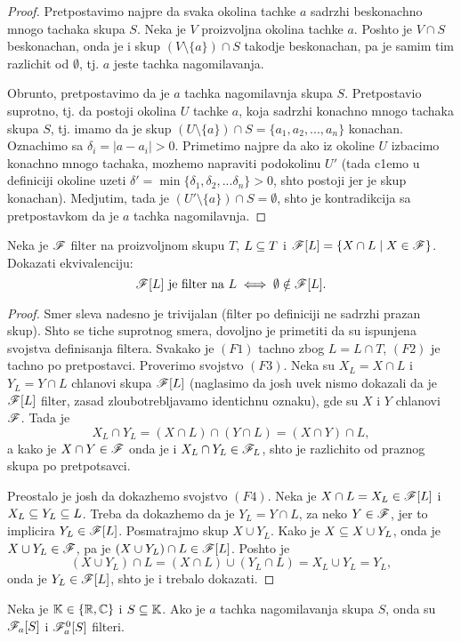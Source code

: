 \documentclass[../main_og.tex]{subfiles}
\begin{document}
    \begin{proof}
        Pretpostavimo najpre da svaka okolina tachke $a$ sadrzhi beskonachno mnogo tachaka skupa $S$. Neka je $V$ proizvoljna okolina tachke $a$. 
	Poshto je $V\cap S$ beskonachan, onda je i skup $(V\setminus\{a\}) \cap S$ takodje beskonachan, pa je samim tim razlichit od $\emptyset$,
	tj. $a$ jeste tachka nagomilavanja. 

	Obrunto, pretpostavimo da je $a$ tachka nagomilavnja skupa $S$. Pretpostavio suprotno, tj. da postoji okolina $U$ tachke $a$,
	koja sadrzhi konachno mnogo tachaka skupa $S$, tj. imamo da je skup $(U\setminus\{a\})\cap S=\{a_1,a_2,...,a_n\}$ konachan. 
	Oznachimo sa $\delta_i=|a-a_i|>0$.
	Primetimo najpre da ako iz okoline $U$ izbacimo konachno mnogo tachaka, mozhemo napraviti podokolinu
	$U'$ (tada c1emo u definiciji okoline uzeti $\delta'=\min\{\delta_1,\delta_2,...\delta_n\}>0$, shto postoji jer je skup konachan). 
	Medjutim, tada je $(U'\setminus\{a\})\cap S=\emptyset$, shto je kontradikcija sa pretpostavkom da je $a$ tachka nagomilavnja.
    \end{proof}

    \begin{st}
    	Neka je $\mathscr{F}$ filter na proizvoljnom skupu $T$, $L\subseteq T$ i $\mathscr{F}[L]=\{X\cap L\mid X \in \mathscr{F}\}$. Dokazati ekvivalenciju:
	\[\mathscr{F}[L] \text{ je filter na } L \iff \emptyset \notin \mathscr{F}[L].\]
    \end{st}
    \begin{proof}
    	Smer sleva nadesno je trivijalan (filter po definiciji ne sadrzhi prazan skup). 
	Shto se tiche suprotnog smera, dovoljno je primetiti da su ispunjena svojstva definisanja filtera.
	Svakako je $(F1)$ tachno zbog $L=L\cap T$, $(F2)$ je tachno po pretpostavci. Proverimo svojstvo $(F3)$. 
	Neka su $X_L=X\cap L$ i $Y_L=Y\cap L$ chlanovi skupa $\mathscr{F}[L]$ (naglasimo da josh uvek nismo dokazali da je $\mathscr{F}[L]$ filter, 
	zasad zloubotrebljavamo identichnu oznaku), gde su $X$ i $Y$ chlanovi $\mathscr{F}$.
	Tada je \[X_L \cap Y_L = (X\cap L) \cap (Y\cap L) = (X\cap Y)\cap L,\]
	a kako je $X\cap Y \in \mathscr{F}$ onda je i $X_L\cap Y_L\in \mathscr{F}_L$, shto je razlichito od praznog skupa po pretpotsavci.

	Preostalo je josh da dokazhemo svojstvo $(F4)$. Neka je $X\cap L=X_L\in \mathscr{F}[L]$ i $X_L\subseteq Y_L\subseteq L$. Treba da dokazhemo da je $Y_L=Y\cap L$, za neko $Y \in \mathscr{F}$, jer to implicira $Y_L \in \mathscr{F}[L]$.
	Posmatrajmo skup $X\cup Y_L$. Kako je $X\subseteq X\cup Y_L$, onda je $X\cup Y_L \in \mathscr{F}$, pa je $(X\cup Y_L)\cap L \in \mathscr{F}[L]$. Poshto je 
	\[(X\cup Y_L)\cap L=(X\cap L)\cup(Y_L\cap L)=X_L\cup Y_L=Y_L,\]
	onda je $Y_L\in \mathscr{F}[L]$, shto je i trebalo dokazati.
    \end{proof}
    \begin{posl}
    	\label{filterokolinaposl}
	Neka je $\mathbb{K}\in\{\mathbb{R},\mathbb{C}\}$ i $S\subseteq \mathbb{K}$. Ako je $a$ tachka nagomilavanja skupa $S$, onda su $\mathscr{F}_a[S]$ i $\mathscr{F}_a^0[S]$ filteri.	
    \end{posl}
\end{document}
